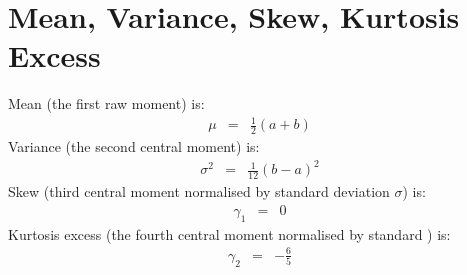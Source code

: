 \section{Mean, Variance, Skew, Kurtosis Excess}
Mean (the first raw moment) is:
\begin{eqnarray}
	\mu &=& \frac{1}{2}(a + b)
\end{eqnarray}
Variance (the second central moment) is:
\begin{eqnarray}
	\sigma^{2} &=& \frac{1}{12}(b - a)^{2}
\end{eqnarray}
Skew (third central moment normalised by standard deviation $\sigma$) is:
\begin{eqnarray}
	\gamma_{1} &=& 0
\end{eqnarray}
Kurtosis excess (the fourth central moment normalised by standard ) is:
\begin{eqnarray}
	\gamma_{2} &=& -\frac{6}{5}
\end{eqnarray}
